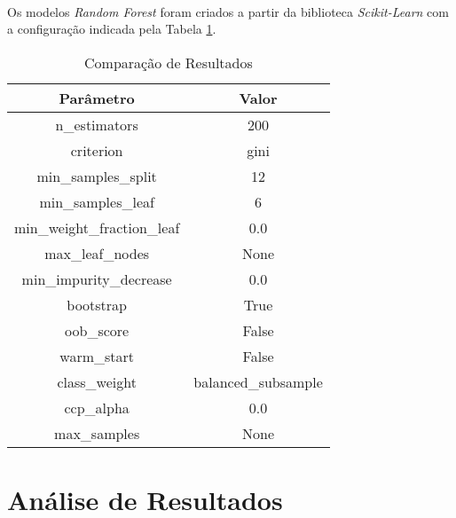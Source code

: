 \paragraph{} Os modelos \textit{Random Forest} foram criados a partir da biblioteca \textit{Scikit-Learn} \cite{scikit} com a configuração indicada pela Tabela \ref{tab:8}.

\begin{table}[h!]
    \begin{center}
        \begin{tabular}{ c|c }
            Parâmetro & Valor \\
            \hline
            n\_estimators & 200 \\
            criterion & gini \\
            min\_samples\_split & 12 \\
            min\_samples\_leaf & 6 \\
            min\_weight\_fraction\_leaf & 0.0 \\
            max\_leaf\_nodes & None \\
            min\_impurity\_decrease & 0.0 \\
            bootstrap & True \\
            oob\_score & False \\
            warm\_start & False \\
            class\_weight & balanced\_subsample \\
            ccp\_alpha & 0.0 \\
            max\_samples & None \\
        \end{tabular}
        \caption{Comparação de Resultados}
        \label{tab:8}
    \end{center}
\end{table}






\section{Análise de Resultados}


